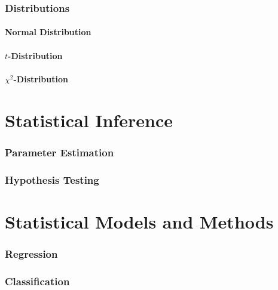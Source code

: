 \documentclass{article}
\begin{document}
\section{Distributions}
\subsection{Normal Distribution}
\subsection{$t$-Distribution}
\subsection{$\chi^2$-Distribution}

\newpage
\part{Statistical Inference}
\section{Parameter Estimation}
\section{Hypothesis Testing}

\newpage
\part{Statistical Models and Methods}
\section{Regression}
\section{Classification}

    
\end{document}
